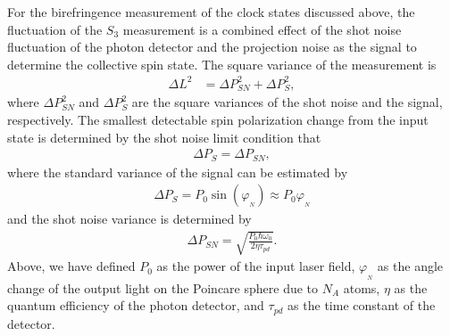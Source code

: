 \documentclass[preprint,aps,pra,onecolumn]{revtex4-1} %
\begin{document}
For the birefringence measurement of the clock states discussed above, the fluctuation of the $ S_3 $ measurement is a combined effect of the shot noise fluctuation of the photon detector and the projection noise as the signal to determine the collective spin state. The square variance of the measurement is
\begin{align}
\Delta L^2 &= \Delta P^2_{SN} + \Delta P^2_S ,
\end{align}
where $ \Delta P^2_{SN} $ and $ \Delta P^2_{S} $ are the square variances of the shot noise and the signal, respectively. 
The smallest detectable spin polarization change from the input state is determined by the shot noise limit condition that 
\begin{align}
\Delta P_S = \Delta P_{SN},
\end{align}
where the standard variance of the signal can be estimated by
\begin{align}
\Delta P_S=P_0 \sin(\varphi_{_N}) \approx P_0 \varphi_{_N}
\end{align}
and the shot noise variance is determined by~\cite{Smith2003a}
\begin{align}
\Delta P_{SN} = \sqrt{\frac{P_0 \hbar \omega_0 }{2\eta \tau_{pd}}}.
\end{align}
Above, we have defined $P_0$ as the power of the input laser field, $\varphi_{_N}$ as the angle change 
of the output light on the Poincare sphere due to $N_A$ atoms, $\eta$ as the quantum efficiency of the 
photon detector, and $\tau_{pd}$ as the time constant of the detector. 
\end{document}
